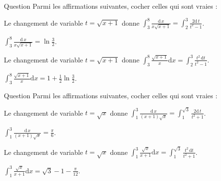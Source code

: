 \begin{multi}{Question}
Parmi les affirmations suivantes, cocher celles qui sont vraies :

    \item* Le changement de variable \(t=\sqrt{x+1}\) donne \(\displaystyle \int _{3}^{8}\frac{\mathrm{d}\, x}{x\sqrt{x+1}}=\int _{2}^{3}\frac{2\mathrm{d}\, t}{t^2-1}\).
    \item* \(\displaystyle \int _{3}^{8}\frac{\mathrm{d}\, x}{x\sqrt{x+1}}=\ln \frac{3}{2}\).
    \item Le changement de variable \(t=\sqrt{x+1}\) donne \(\displaystyle \int _3^8\frac{\sqrt{x+1}}{x}\mathrm{d}x=\int _2^3\frac{t^2\, \mathrm{d}t}{t^2-1}\).
    \item \(\displaystyle \int _3^8\frac{\sqrt{x+1}}{x}\mathrm{d}x=1+\frac{1}{2}\ln \frac{3}{2}\).
\end{multi}


\begin{multi}{Question}
Parmi les affirmations suivantes, cocher celles qui sont vraies :

    \item* Le changement de variable \(t=\sqrt{x}\) donne \(\displaystyle \int _{1}^{3}\frac{\mathrm{d}\, x}{(x+1)\sqrt{x}}=\int _{1}^{\sqrt{3}}\frac{2\mathrm{d}\, t}{t^2+1}\).
    \item* \(\displaystyle \int _1^3\frac{\mathrm{d}\, x}{(x+1)\sqrt{x}}=\frac{\pi}{6}\).
    \item Le changement de variable \(t=\sqrt{x}\) donne \(\displaystyle \int _1^3\frac{\sqrt{x}}{x+1}\mathrm{d}x=\int _1^{\sqrt{3}}\frac{t^2\, \mathrm{d}t}{t^2+1}\).
    \item \(\displaystyle \int _1^3\frac{\sqrt{x}}{x+1}\mathrm{d}x=\sqrt{3}-1-\frac{\pi}{12}\).
\end{multi}


